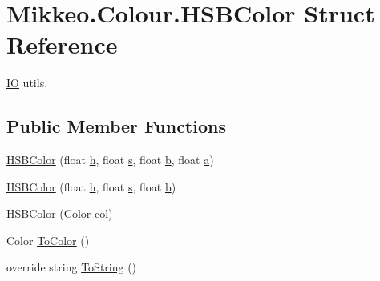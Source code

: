 \hypertarget{struct_mikkeo_1_1_colour_1_1_h_s_b_color}{}\section{Mikkeo.\+Colour.\+H\+S\+B\+Color Struct Reference}
\label{struct_mikkeo_1_1_colour_1_1_h_s_b_color}


\hyperlink{namespace_mikkeo_1_1_i_o}{IO} utils.  


\subsection*{Public Member Functions}
\begin{DoxyCompactItemize}
\item 
\hyperlink{struct_mikkeo_1_1_colour_1_1_h_s_b_color_a4fe4468cc6e9dd7181ad8c0f315e5189}{H\+S\+B\+Color} (float \hyperlink{struct_mikkeo_1_1_colour_1_1_h_s_b_color_a02a8b048ad3e20a748c5caa27d11273e}{h}, float \hyperlink{struct_mikkeo_1_1_colour_1_1_h_s_b_color_ab7d0e76376413147a3d5b26f8ed5da1a}{s}, float \hyperlink{struct_mikkeo_1_1_colour_1_1_h_s_b_color_afed08c1798d410979a8fbef3787384e5}{b}, float \hyperlink{struct_mikkeo_1_1_colour_1_1_h_s_b_color_a9042c66e979e55cd1b6e04e64470e468}{a})
\item 
\hyperlink{struct_mikkeo_1_1_colour_1_1_h_s_b_color_ad46e388d1b4d4b45a759372aed0a8176}{H\+S\+B\+Color} (float \hyperlink{struct_mikkeo_1_1_colour_1_1_h_s_b_color_a02a8b048ad3e20a748c5caa27d11273e}{h}, float \hyperlink{struct_mikkeo_1_1_colour_1_1_h_s_b_color_ab7d0e76376413147a3d5b26f8ed5da1a}{s}, float \hyperlink{struct_mikkeo_1_1_colour_1_1_h_s_b_color_afed08c1798d410979a8fbef3787384e5}{b})
\item 
\hyperlink{struct_mikkeo_1_1_colour_1_1_h_s_b_color_a1e407d5c5f321c8c046ac3e531d6de04}{H\+S\+B\+Color} (Color col)
\item 
Color \hyperlink{struct_mikkeo_1_1_colour_1_1_h_s_b_color_a30f3f03503bc620f7bc7e37f783bfee4}{To\+Color} ()
\item 
override string \hyperlink{struct_mikkeo_1_1_colour_1_1_h_s_b_color_ae7a646ab139656af3ca05056c4d90c3a}{To\+String} ()
\end{DoxyCompactItemize}
